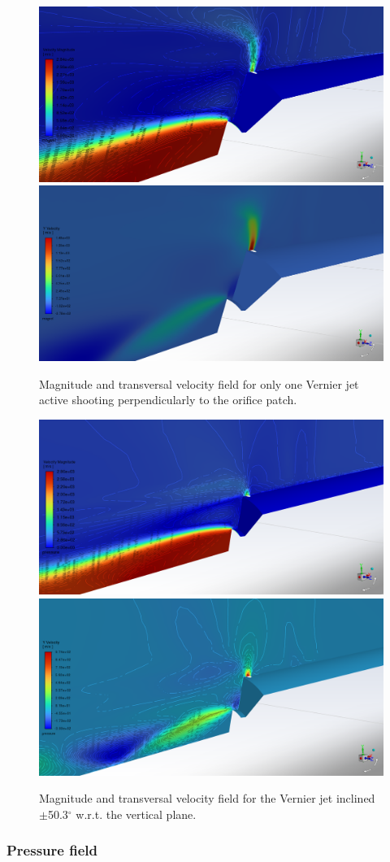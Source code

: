 \documentclass[12pt]{article}
\begin{document}
\begin{figure}[H]
    \centering
    \includegraphics[width=0.495\linewidth]{figs/t65s/t65s_V1only_magV2.PNG}
    \includegraphics[width=0.495\linewidth]{figs/t65s/t65s_V1only_v.PNG}
    \caption{Magnitude and transversal velocity field for only one Vernier jet active shooting perpendicularly to the orifice patch.}
    \label{fig:enter-label}
\end{figure}

\begin{figure}[H]
    \centering
    \includegraphics[width=0.495\linewidth]{figs/t65s/t65s_V50_magV.PNG}
    \includegraphics[width=0.495\linewidth]{figs/t65s/t65s_V50_v.PNG}
    \caption{Magnitude and transversal velocity field for the Vernier jet inclined $\pm$50.3$^\circ$ w.r.t. the vertical plane.}
   \label{fig:enter-label}
\end{figure}

\subsubsection*{Pressure field}
\end{document}
